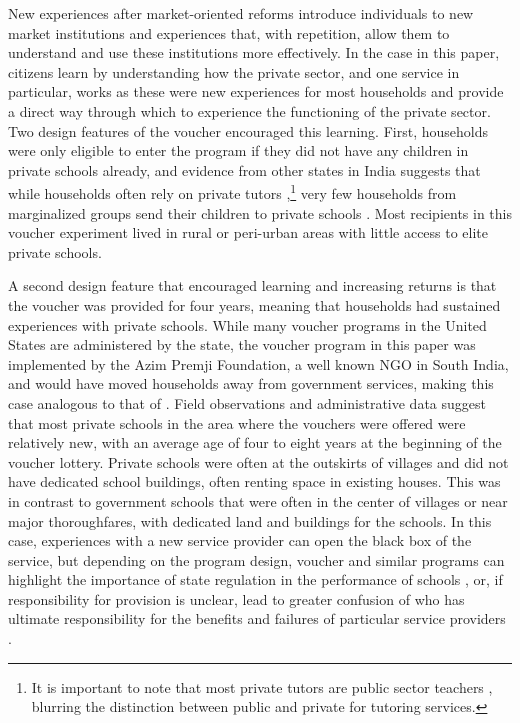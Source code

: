 \documentclass[hidelinks, 12pt, titlepage]{article}
\begin{document}
New experiences after market-oriented reforms introduce individuals to new market institutions and experiences that, with repetition, allow them to understand and use these institutions more effectively.  In the case in this paper, citizens learn by understanding how the private sector, and one service in particular, works as these were new experiences for most households and provide a direct way through which to experience the functioning of the private sector.  Two design features of the voucher encouraged this learning. First, households were only eligible to enter the program if they did not have any children in private schools already, and evidence from other states in India suggests that while households often rely on private tutors \citep{ASER2019},\footnote{It is important to note that most private tutors are public sector teachers \citep{Jayachandran2013}, blurring the distinction between public and private for tutoring services.} very few households from marginalized groups send their children to private schools \citep{Romero2022}.  Most recipients in this voucher experiment lived in rural or peri-urban areas with little access to elite private schools.

A second design feature that encouraged learning and increasing returns is that the voucher was provided for four years, meaning that households had sustained experiences with private schools.  While many voucher programs in the United States are administered by the state, the voucher program in this paper was implemented by the Azim Premji Foundation, a well known NGO in South India, and would have moved households away from government services, making this case analogous to that of \cite{Carlson2016}.  Field observations and administrative data suggest that most private schools in the area where the vouchers were offered were relatively new, with an average age of four to eight years at the beginning of the voucher lottery.  Private schools were often at the outskirts of villages and did not have dedicated school buildings, often renting space in existing houses.  This was in contrast to government schools that were often in the center of villages or near major thoroughfares, with dedicated land and buildings for the schools.  In this case, experiences with a new service provider can open the black box of the service, but depending on the program design, voucher and similar programs can highlight the importance of state regulation in the performance of schools \citep{Fleming2014}, or, if responsibility for provision is unclear, lead to greater confusion of who has ultimate responsibility for the benefits and failures of particular service providers \citep{Carlson2016}.
\end{document}
